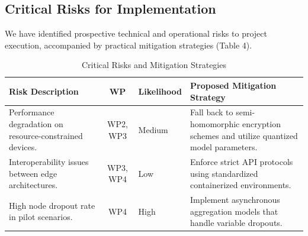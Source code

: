 \subsection{Critical Risks for Implementation}
\label{sec:risks}

We have identified prospective technical and operational risks to project execution, accompanied by practical mitigation strategies (Table 4).

\begin{table}[h]
\caption{Critical Risks and Mitigation Strategies}
\label{tab:risks}
\begin{tabularx}{\textwidth}{p{3.5cm} c p{2cm} X}
\toprule
\textbf{Risk Description} & \textbf{WP} & \textbf{Likelihood} & \textbf{Proposed Mitigation Strategy} \\
\midrule
\rowcolor{lightbg}
Performance degradation on resource-constrained devices. & WP2, WP3 & Medium & Fall back to semi-homomorphic encryption schemes and utilize quantized model parameters. \\
Interoperability issues between edge architectures. & WP3, WP4 & Low & Enforce strict API protocols using standardized containerized environments. \\
\rowcolor{lightbg}
High node dropout rate in pilot scenarios. & WP4 & High & Implement asynchronous aggregation models that handle variable dropouts. \\
\bottomrule
\end{tabularx}
\end{table}
